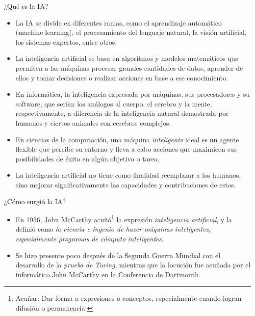 \documentclass[11pt,aspectratio=169]{beamer}
\begin{document}
\begin{frame}{¿Qué es la IA?}
    \begin{itemize}
        \item La IA se divide en diferentes ramas, como el aprendizaje automático 
            (machine learning), el procesamiento del lenguaje natural, la visión artificial, 
            los sistemas expertos, entre otros.\pause
        \item La inteligencia artificial se basa en algoritmos y modelos matemáticos \pause
            que permiten a las máquinas procesar grandes cantidades de datos, aprender 
            de ellos y tomar decisiones o realizar acciones en base a ese conocimiento. \pause
        \item En informática, la inteligencia expresada por máquinas, sus procesadores y 
            su software, que serían los análogos al cuerpo, el cerebro y la mente, 
            respectivamente, a diferencia de la inteligencia natural demostrada por humanos 
            y ciertos animales con cerebros complejos.\pause
	    \item En ciencias de la computación, una máquina \textit{inteligente} ideal es un 
            agente flexible que percibe su entorno y lleva a cabo acciones que maximicen 
            sus posibilidades de éxito en algún objetivo o tarea.\pause
        \item La inteligencia artificial no tiene como finalidad reemplazar a los humanos, 
            sino mejorar significativamente las capacidades y contribuciones de estos.  
    \end{itemize}
\end{frame}

\begin{frame}{¿Cómo surgió la IA?}\pause
    \begin{itemize}
        \item En 1956, John McCarthy acuñó\footnote{Acuñar: Dar forma a expresiones o 
            conceptos, especialmente cuando logran difusión o permanencia.} la expresión 
            \textit{inteligencia artificial}, y la definió como \textit{la ciencia e ingenio 
            de hacer máquinas inteligentes, especialmente programas de cómputo inteligentes}.
            \pause
        \item Se hizo presente poco después de la Segunda Guerra Mundial con el desarrollo 
            de la \textit{prueba de Turing}, mientras que la locución fue acuñada 
            por el informático John McCarthy en la Conferencia de Dartmouth. 
    \end{itemize}
\end{frame}
\end{document}
